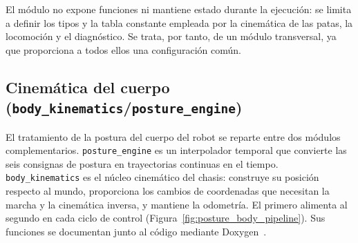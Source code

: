 El módulo no expone funciones ni mantiene estado durante la ejecución: se
limita a definir los tipos y la tabla constante empleada por la cinemática de
las patas, la locomoción y el diagnóstico. Se trata, por tanto, de un módulo
transversal, ya que proporciona a todos ellos una configuración común.


\newpage


\subsection{Cinemática del cuerpo (\texttt{body\_kinematics}/\texttt{posture\_engine})}
\label{subsec:posture_body_kinematics}
\label{subsec:posture_engine}
\label{subsec:body_kinematics}

El tratamiento de la postura del cuerpo del robot se reparte entre dos módulos
complementarios. \texttt{posture\_engine} es un interpolador temporal que
convierte las seis consignas de postura en trayectorias continuas en el tiempo. \texttt{body\_kinematics} es el núcleo cinemático del chasis: construye su
posición respecto al mundo, proporciona los cambios de coordenadas que necesitan la
marcha y la cinemática inversa, y mantiene la odometría. El primero
alimenta al segundo en cada ciclo de control
(Figura~\ref{fig:posture_body_pipeline}). Sus funciones
se documentan junto al código mediante Doxygen~\cite{doxygen}.

